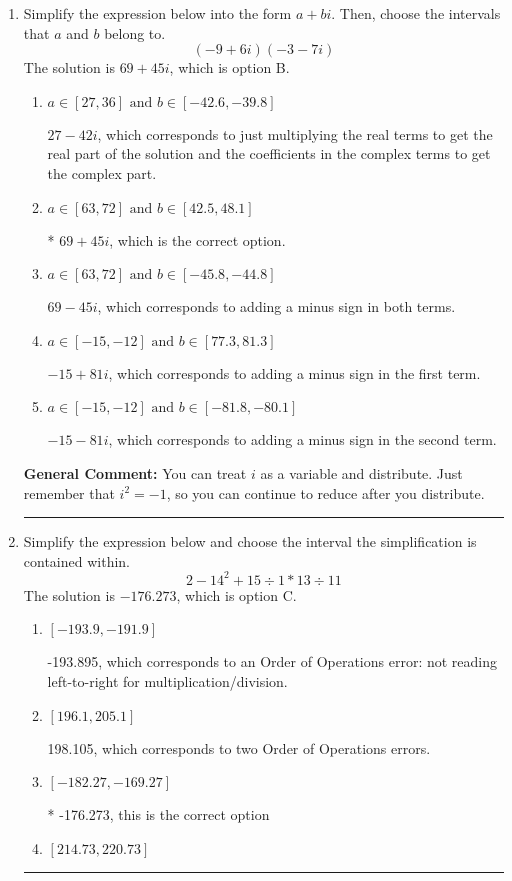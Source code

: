 \documentclass{extbook}[14pt]
\newcommand{\litem}[1]{\item #1

\rule{\textwidth}{0.4pt}}
\begin{document}
\begin{enumerate}\litem{
Simplify the expression below into the form $a+bi$. Then, choose the intervals that $a$ and $b$ belong to.
\[ (-9 + 6 i)(-3 - 7 i) \]The solution is \( 69 + 45 i \), which is option B.\begin{enumerate}[label=\Alph*.]
\item \( a \in [27, 36] \text{ and } b \in [-42.6, -39.8] \)

 $27 - 42 i$, which corresponds to just multiplying the real terms to get the real part of the solution and the coefficients in the complex terms to get the complex part.
\item \( a \in [63, 72] \text{ and } b \in [42.5, 48.1] \)

* $69 + 45 i$, which is the correct option.
\item \( a \in [63, 72] \text{ and } b \in [-45.8, -44.8] \)

 $69 - 45 i$, which corresponds to adding a minus sign in both terms.
\item \( a \in [-15, -12] \text{ and } b \in [77.3, 81.3] \)

 $-15 + 81 i$, which corresponds to adding a minus sign in the first term.
\item \( a \in [-15, -12] \text{ and } b \in [-81.8, -80.1] \)

 $-15 - 81 i$, which corresponds to adding a minus sign in the second term.
\end{enumerate}

\textbf{General Comment:} You can treat $i$ as a variable and distribute. Just remember that $i^2=-1$, so you can continue to reduce after you distribute.
}
\litem{
Simplify the expression below and choose the interval the simplification is contained within.
\[ 2 - 14^2 + 15 \div 1 * 13 \div 11 \]The solution is \( -176.273 \), which is option C.\begin{enumerate}[label=\Alph*.]
\item \( [-193.9, -191.9] \)

 -193.895, which corresponds to an Order of Operations error: not reading left-to-right for multiplication/division.
\item \( [196.1, 205.1] \)

 198.105, which corresponds to two Order of Operations errors.
\item \( [-182.27, -169.27] \)

* -176.273, this is the correct option
\item \( [214.73, 220.73] \)


\end{enumerate}}
\end{enumerate}
\end{document}
